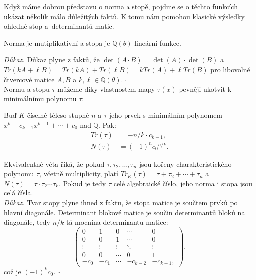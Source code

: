 \documentclass[12pt]{report}
\begin{document}
Když máme dobrou představu o norma a stopě, pojďme se o těchto funkcích ukázat několik málo důležitých faktů. K tomu nám pomohou klasické výsledky ohledně stop a~determinantů matic.

\begin{veta}
Norma je mutiplikativní a stopa je $\mathbb{Q}(\theta)$-lineární funkce.
\end{veta}
\noindent \textit{Důkaz.} Důkaz plyne z faktů, že $\det(A \cdot B) = \det(A) \cdot \det(B)$ a $Tr(kA+\ell B) = Tr(kA) + Tr(\ell B) = kTr(A)+\ell Tr(B)$ pro libovolné čtvercové matice $A,B$ a $k,\ell \in \mathbb{Q}(\theta)$. \hfill $\square$\\

Normu a stopu $\tau$ můžeme díky vlastnostem mapy $\tau(x)$ pevněji ukotvit k minimálnímu polynomu $\tau$:

\begin{veta}
Buď $K$ číselné těleso stupně $n$ a $\tau$ jeho prvek s minimálním polynomem $x^k + c_{k-1} x^{k-1} + \cdots  + c_0$ nad $\mathbb{Q}$. Pak:
\begin{align*}
Tr(\tau) &= - n/k \cdot c_{k-1},\\
N(\tau) &= (-1)^n {c_0}^{n/k}.
\end{align*} 
\end{veta}

Ekvivalentně věta říká, že pokud $\tau, \tau_2,\dots,\tau_n$ jsou kořeny charakteristického polynomu $\tau$, včetně multiplicity, platí $Tr_K(\tau) = \tau + \tau_2+\cdots+\tau_n$ a $N(\tau) = \tau \cdot \tau_2 \cdots \tau_k$. Pokud je tedy $\tau$ celé algebraické číslo, jeho norma i stopa jsou celá čísla.\\

\noindent\textit{Důkaz.} Tvar stopy plyne ihned z faktu, že stopa matice je součtem prvků po hlavní diagonále.  Determinant blokové matice je součin determinantů bloků na diagonále, tedy $n/k$-tá mocnina determinantu matice:
\begin{equation*}
 \begin{pmatrix}
0 & 1 & 0 & \cdots & 0\\
0 & 0 & 1 & \cdots & 0\\
\vdots & \vdots & \vdots & \ddots &\vdots\\
0 & 0 & \cdots & 0& 1\\
-c_0 & -c_1 & \cdots & -c_{k-2} & -c_{k-1},
\end{pmatrix}.
\end{equation*}
což je $(-1)^k c_{0}$. \hfill $\square$\\
\end{document}
